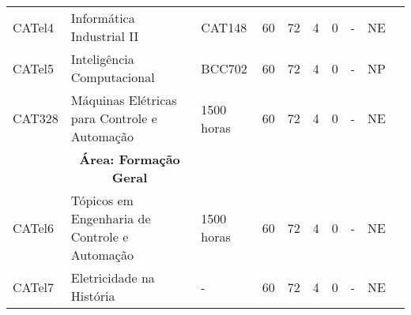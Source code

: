 \begin{table}[tbp]
{\begin{tabular}{llllllllll}
			\multicolumn{1}{|l|}{CATel4}                    & \multicolumn{1}{l|}{Informática Industrial II}                                            & \multicolumn{1}{l|}{CAT148}                 & \multicolumn{1}{l|}{60}                                                           & \multicolumn{1}{l|}{72}               & \multicolumn{1}{l|}{4}  & \multicolumn{1}{l|}{0}  & \multicolumn{1}{l|}{-}                & \multicolumn{1}{l|}{NE}            &  \\ \cline{1-9}
			\multicolumn{1}{|l|}{CATel5}                    & \multicolumn{1}{l|}{Inteligência Computacional}                                           & \multicolumn{1}{l|}{BCC702}                 & \multicolumn{1}{l|}{60}                                                           & \multicolumn{1}{l|}{72}               & \multicolumn{1}{l|}{4}  & \multicolumn{1}{l|}{0}  & \multicolumn{1}{l|}{-}                & \multicolumn{1}{l|}{NP}            &  \\ \cline{1-9}
			\multicolumn{1}{|l|}{CAT328}                    & \multicolumn{1}{l|}{Máquinas Elétricas para Controle e Automação}                         & \multicolumn{1}{l|}{1500 horas}             & \multicolumn{1}{l|}{60}                                                           & \multicolumn{1}{l|}{72}               & \multicolumn{1}{l|}{4}  & \multicolumn{1}{l|}{0}  & \multicolumn{1}{l|}{-}                & \multicolumn{1}{l|}{NE}            &  \\ \cline{1-9}
			\multicolumn{1}{|l|}{}                          & \multicolumn{1}{c|}{\textbf{Área: Formação Geral}}                                        & \multicolumn{1}{l|}{}                       & \multicolumn{1}{l|}{}                                                             & \multicolumn{1}{l|}{}                 & \multicolumn{1}{l|}{}   & \multicolumn{1}{l|}{}   & \multicolumn{1}{l|}{}                 & \multicolumn{1}{l|}{}              &  \\ \cline{1-9}
			\multicolumn{1}{|l|}{CATel6}                    & \multicolumn{1}{l|}{Tópicos em Engenharia de Controle e Automação}                        & \multicolumn{1}{l|}{1500 horas}             & \multicolumn{1}{l|}{60}                                                           & \multicolumn{1}{l|}{72}               & \multicolumn{1}{l|}{4}  & \multicolumn{1}{l|}{0}  & \multicolumn{1}{l|}{-}                & \multicolumn{1}{l|}{NE}            &  \\ \cline{1-9}
			\multicolumn{1}{|l|}{CATel7}                    & \multicolumn{1}{l|}{Eletricidade na História}                    & \multicolumn{1}{l|}{-}          & \multicolumn{1}{l|}{60}                                                           & \multicolumn{1}{l|}{72}               & \multicolumn{1}{l|}{4}  & \multicolumn{1}{l|}{0}  & \multicolumn{1}{l|}{-}                & \multicolumn{1}{l|}{NE}            &  \\ \cline{1-9}

\end{tabular}}
\end{table}
